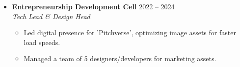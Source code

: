 \documentclass[a4paper,10pt]{article}
\newcommand{\resumeItem}[1]{\item\small{#1}}
\begin{document}
\begin{itemize}[leftmargin=0.15in, label={}]
\begin{itemize}[leftmargin=0.2in]
                    \resumeItem{Reduced complex query latency from 900ms to 10ms (98\% reduction) via node-level caching.}
                
                    \resumeItem{Built an internal debugging dashboard to reduce root-cause analysis time.}
                
            
        \end{itemize}
    
    \item
        \textbf{Entrepreneurship Development Cell} \hfill 
        2022 -- 2024 \\
        \textit{Tech Lead \& Design Head}
        \begin{itemize}[leftmargin=0.2in]
            
                
                    \resumeItem{Led digital presence for 'Pitchverse', optimizing image assets for faster load speeds.}
                
                    \resumeItem{Managed a team of 5 designers/developers for marketing assets.}
                
            
        \end{itemize}
    
\end{itemize}

\end{document}

